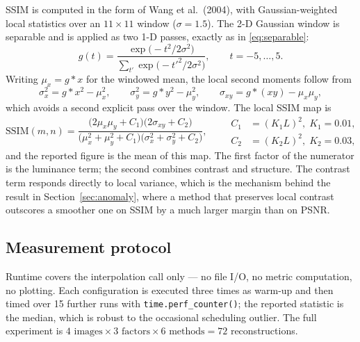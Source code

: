 \documentclass[11pt,a4paper]{article}
\begin{document}
SSIM is computed in the form of Wang et al.\ (2004), with Gaussian-weighted local statistics
over an $11\times11$ window ($\sigma = 1.5$). The 2-D Gaussian window is separable and is
applied as two 1-D passes, exactly as in \eqref{eq:separable}:
\begin{equation}
g(t) = \frac{\exp\!\big(-t^{2}/2\sigma^{2}\big)}{\sum_{t'} \exp\!\big(-t'^{2}/2\sigma^{2}\big)},
\qquad t = -5,\dots,5 .
\label{eq:gauss}
\end{equation}
Writing $\mu_{x} = g * x$ for the windowed mean, the local second moments follow from
\begin{equation}
\sigma_{x}^{2} = g * x^{2} - \mu_{x}^{2},
\qquad
\sigma_{y}^{2} = g * y^{2} - \mu_{y}^{2},
\qquad
\sigma_{xy} = g * (xy) - \mu_{x}\mu_{y},
\label{eq:moments}
\end{equation}
which avoids a second explicit pass over the window. The local SSIM map is
\begin{equation}
\mathrm{SSIM}(m,n) =
\frac{\big(2\mu_{x}\mu_{y} + C_{1}\big)\big(2\sigma_{xy} + C_{2}\big)}
     {\big(\mu_{x}^{2} + \mu_{y}^{2} + C_{1}\big)\big(\sigma_{x}^{2} + \sigma_{y}^{2} + C_{2}\big)},
\qquad
\begin{aligned}
C_{1} &= (K_{1}L)^{2}, \; K_{1} = 0.01,\\
C_{2} &= (K_{2}L)^{2}, \; K_{2} = 0.03,
\end{aligned}
\label{eq:ssim}
\end{equation}
and the reported figure is the mean of this map. The first factor of the numerator is the
luminance term; the second combines contrast and structure. The contrast term responds
directly to local variance, which is the mechanism behind the result in
Section~\ref{sec:anomaly}, where a method that preserves local contrast outscores a smoother
one on SSIM by a much larger margin than on PSNR.

\subsection{Measurement protocol}

Runtime covers the interpolation call only --- no file I/O, no metric computation, no
plotting. Each configuration is executed three times as warm-up and then timed over 15 further
runs with \texttt{time.perf\_counter()}; the reported statistic is the median, which is robust
to the occasional scheduling outlier. The full experiment is
$4 \text{ images} \times 3 \text{ factors} \times 6 \text{ methods} = 72$ reconstructions.
\end{document}
